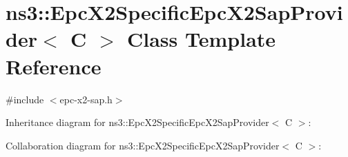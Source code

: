 \hypertarget{classns3_1_1EpcX2SpecificEpcX2SapProvider}{}\section{ns3\+:\+:Epc\+X2\+Specific\+Epc\+X2\+Sap\+Provider$<$ C $>$ Class Template Reference}
\label{classns3_1_1EpcX2SpecificEpcX2SapProvider}


{\ttfamily \#include $<$epc-\/x2-\/sap.\+h$>$}



Inheritance diagram for ns3\+:\+:Epc\+X2\+Specific\+Epc\+X2\+Sap\+Provider$<$ C $>$\+:


Collaboration diagram for ns3\+:\+:Epc\+X2\+Specific\+Epc\+X2\+Sap\+Provider$<$ C $>$\+:
